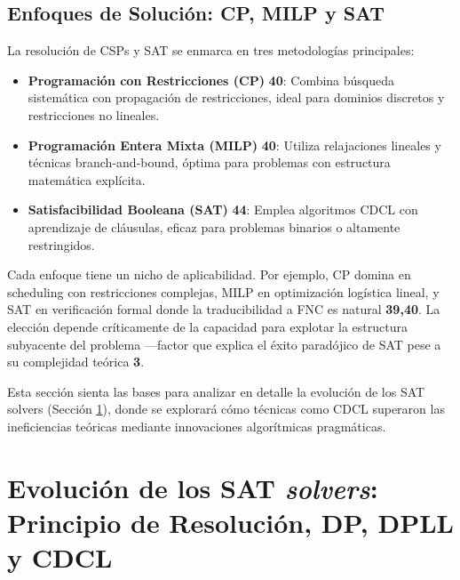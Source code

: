 \subsection{Enfoques de Solución: CP, MILP y SAT}
\label{subsec:enfoques-solucion}

La resolución de CSPs y SAT se enmarca en tres metodologías principales:
\begin{itemize}
\item \textbf{Programación con Restricciones (CP)} \textbf{40}: Combina búsqueda sistemática con propagación de restricciones, ideal para dominios discretos y restricciones no lineales.
\item \textbf{Programación Entera Mixta (MILP)} \textbf{40}: Utiliza relajaciones lineales y técnicas branch-and-bound, óptima para problemas con estructura matemática explícita.
\item \textbf{Satisfacibilidad Booleana (SAT)} \textbf{44}: Emplea algoritmos CDCL con aprendizaje de cláusulas, eficaz para problemas binarios o altamente restringidos.
\end{itemize}

Cada enfoque tiene un nicho de aplicabilidad. Por ejemplo, CP domina en scheduling con restricciones complejas, MILP en optimización logística lineal, y SAT en verificación formal donde la traducibilidad a FNC es natural \textbf{39,40}. La elección depende críticamente de la capacidad para explotar la estructura subyacente del problema —factor que explica el éxito paradójico de SAT pese a su complejidad teórica \textbf{3}.


Esta sección sienta las bases para analizar en detalle la evolución de los SAT solvers (Sección \ref{sec:evolucion-sat-solvers}), donde se explorará cómo técnicas como CDCL superaron las ineficiencias teóricas mediante innovaciones algorítmicas pragmáticas.

\section{Evolución de los SAT \textit{solvers}: Principio de Resolución, DP, DPLL y CDCL}
\label{sec:evolucion-sat-solvers}

